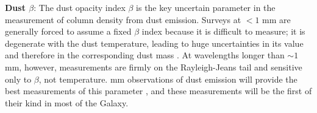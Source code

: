 \documentclass[11pt,preprint]{aastex_nofoot}
\begin{document}
\textbf{Dust $\beta$}:
The dust opacity index $\beta$ is the key uncertain parameter in the measurement
of column density from dust emission.  Surveys at $<1$ mm are generally forced
to assume a fixed $\beta$ index because it is difficult to measure; it
is degenerate with the dust temperature, leading to huge uncertainties in its
value and therefore in the corresponding dust mass \citep[e.g.,][]{Juvela2012a}.
At wavelengths longer than $\sim1$ mm, however, measurements are firmly
on the Rayleigh-Jeans tail and sensitive only to $\beta$, not temperature.
 mm observations of dust emission will provide the best
measurements of this parameter \citep{Schnee2014b}, and these measurements will
be the first of their kind in most of the Galaxy.



\end{document}

